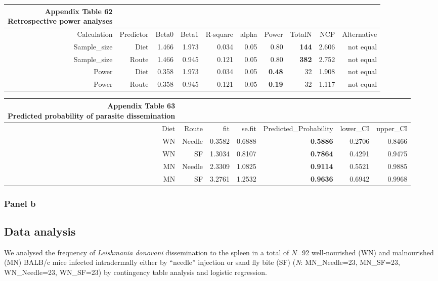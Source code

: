 \documentclass[
  12pt,
  letterpaper,
]{article}
\begin{document}
\begin{longtable}{rrrrrrrrrr}
\caption*{
{\large \textbf{Appendix Table 62}} \\ 
{\small \textbf{Retrospective power analyses}}
} \\ 
\toprule
Calculation & Predictor & Beta0 & Beta1 & R-square & alpha & Power & TotalN & NCP & Alternative \\ 
\midrule\addlinespace[2.5pt]
Sample\_size & Diet & 1.466 & 1.973 & 0.034 & 0.05 & 0.80 & \textbf{144} & 2.606 & not equal \\ 
Sample\_size & Route & 1.466 & 0.945 & 0.121 & 0.05 & 0.80 & \textbf{382} & 2.752 & not equal \\ 
Power & Diet & 0.358 & 1.973 & 0.034 & 0.05 & \textbf{0.48} & 32 & 1.908 & not equal \\ 
Power & Route & 0.358 & 0.945 & 0.121 & 0.05 & \textbf{0.19} & 32 & 1.117 & not equal \\ 
\bottomrule
\end{longtable}

\begin{longtable}{rrrrrrr}
\caption*{
{\large \textbf{Appendix Table 63}} \\ 
{\small \textbf{Predicted probability of parasite dissemination}}
} \\ 
\toprule
Diet & Route & fit & se.fit & Predicted\_Probability & lower\_CI & upper\_CI \\ 
\midrule\addlinespace[2.5pt]
WN & Needle & 0.3582 & 0.6888 & \textbf{0.5886} & 0.2706 & 0.8466 \\ 
WN & SF & 1.3034 & 0.8107 & \textbf{0.7864} & 0.4291 & 0.9475 \\ 
MN & Needle & 2.3309 & 1.0825 & \textbf{0.9114} & 0.5521 & 0.9885 \\ 
MN & SF & 3.2761 & 1.2532 & \textbf{0.9636} & 0.6942 & 0.9968 \\ 
\bottomrule
\end{longtable}

\subsubsection{Panel b}\label{panel-b}

\subsection{Data analysis}\label{data-analysis-3}

We analysed the frequency of \emph{Leishmania donovani} dissemination to the spleen in a total of \emph{N}=92 well-nourished (WN) and malnourished (MN) BALB/c mice infected intradermally either by ``needle'' injection or sand fly bite (SF) (\emph{N}: MN\_Needle=23, MN\_SF=23, WN\_Needle=23, WN\_SF=23) by contingency table analysis and logistic regression.
\end{document}
